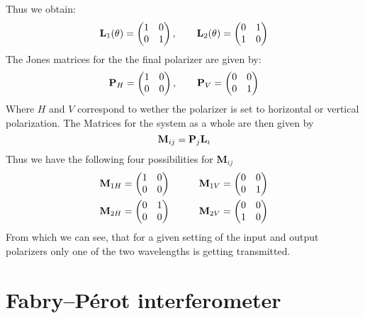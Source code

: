Thus we obtain:
\begin{equation}
	\textbf L_1(\theta) = 
	\begin{pmatrix}
		1 &0\\ 0 & 1
	\end{pmatrix}, \qquad
	\textbf L_2(\theta) = 
	\begin{pmatrix}
		0&1\\  1&0
	\end{pmatrix}
\end{equation}
The Jones matrices for the  the final polarizer are given by:
\begin{equation}
	\textbf P_H=\begin{pmatrix}
		1 &0 \\ 0&0
	\end{pmatrix}, \qquad
\textbf P_V=\begin{pmatrix}
	0 &0 \\ 0&1
\end{pmatrix}
\end{equation}
Where $H$ and $V$ correspond to  wether the polarizer is set to horizontal or vertical polarization. The Matrices for the system as a whole are then given by
\begin{equation}
	\textbf M_{ij}=\textbf P_j\textbf L_i 
\end{equation}
Thus we have the following four possibilities for \textbf M$_{ij}$
\begin{alignat}{2}
	&\textbf M_{1H}=\begin{pmatrix}
		1 & 0\\ 0&0
	\end{pmatrix} \qquad
&&\textbf M_{1V}=\begin{pmatrix}
	0 & 0\\ 0&1
\end{pmatrix}\\
	&\textbf M_{2H}=\begin{pmatrix}
	0 & 1\\ 0&0
\end{pmatrix} 
&&\textbf M_{2V}=\begin{pmatrix}
	0 & 0\\1&0
\end{pmatrix}
	\end{alignat}
From which we can see, that for a given setting of the input and output polarizers only one of the two wavelengths is getting transmitted.
\section{Fabry–Pérot interferometer}

